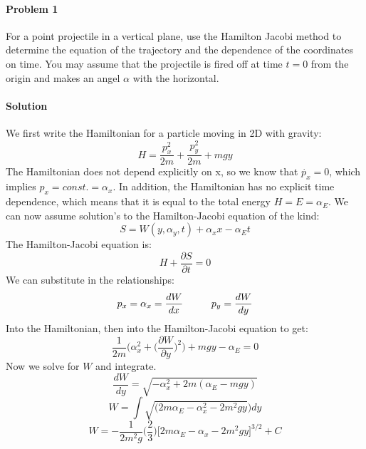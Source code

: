 \documentclass[11pt,a4paper]{report}
\begin{document}
\paragraph{Problem 1} For a point projectile in a vertical plane, use the Hamilton Jacobi method to determine the equation of the trajectory and the dependence of the coordinates on time. You may assume that the projectile is fired off at time $t=0$ from the origin and makes an angel $\alpha$ with the horizontal.

\paragraph{Solution} We first write the Hamiltonian for a particle moving in 2D with gravity:
\begin{equation}
H=\dfrac{p_x^2}{2m}+\dfrac{p_y^2}{2m}+mgy
\end{equation}
The Hamiltonian does not depend explicitly on x, so we know that $\dot{p_x}=0$, which implies $p_x=const.=\alpha_x$. In addition, the Hamiltonian has no explicit time dependence, which means that it is equal to the total energy $H = E = \alpha_E$. We can now assume solution's to the Hamilton-Jacobi equation of the kind:
\begin{equation}
S = W(y, \alpha_y, t)+\alpha_x x -\alpha_E t
\end{equation}
The Hamilton-Jacobi equation is:
\begin{equation}
H+\dfrac{\partial S}{\partial t} = 0
\end{equation}
We can substitute in the relationships:
\begin{equation}
p_x=\alpha_x = \dfrac{dW}{dx} \hspace{10mm}
p_y = \dfrac{dW}{dy}
\end{equation}
Into the Hamiltonian, then into the Hamilton-Jacobi equation to get:
\begin{equation}
\dfrac{1}{2m}\Big(\alpha_x^2 +\Big(\dfrac{\partial W}{\partial y}\Big)^2 \Big)+mgy-\alpha_E=0
\end{equation}
Now we solve for $W$ and integrate.
\begin{equation}
\dfrac{dW}{dy}=\sqrt{-\alpha_x^2 +2m(\alpha_E-mgy)}
\end{equation}
\begin{equation}
W = \int\sqrt{(2m\alpha_E-\alpha_x^2-2m^2gy}) dy
\end{equation}
\begin{equation}
W = -\dfrac{1}{2m^2g}\Big(\dfrac{2}{3}\Big)\Big[2m\alpha_E-\alpha_x-2m^2gy\Big]^{3/2}+C
\end{equation}
\end{document}
